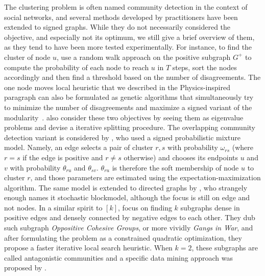 The clustering problem is often named community detection in the context of social networks, and
several methods developed by practitioners have been extended to signed graphs. While they do not
necessarily considered the \pcc{} objective, and especially not its optimum, we still give a brief
overview of them, as they tend to have been more tested experimentally. For instance, to find the
cluster of node $u$, \textcite{Yang2007} use a random walk approach on the positive subgraph $G^+$
to compute the probability of each node to reach $u$ in $T$ steps, sort the nodes accordingly and
then find a threshold  based on the number of disagreements.
The one node moves local heuristic that we described in the Physics-inspired paragraph
 can also be formulated as genetic algorithms that simultaneously try to
minimize the number of disagreements and maximize a signed variant of the
modularity~\autocites{Li2013}{Amelio2013}. \Textcite{Anchuri2012} also consider these two objectives
by seeing them as eigenvalue problems and devise a iterative splitting procedure.
The overlapping community detection variant is considered by \textcite{Chen14}, who used a signed
probabilistic mixture model. Namely, an edge selects a pair of cluster $r,s$ with probability
$\omega_{rs}$ (where $r=s$ if the edge is positive and $r\neq s$ otherwise) and chooses its endpoints
$u$ and $v$ with probability $\theta_{ru}$ and $\theta_{sv}$. $\theta_{ru}$ is therefore the soft
membership of node $u$ to cluster $r$, and those parameters are estimated using the
expectation-maximization algorithm. The same model is extended to directed graphs by
\textcite{Jiang2015}, who strangely enough names it stochastic blockmodel, although the focus is
still on edge and not nodes.
In a similar spirit to \maxa{}$[k]$, \textcite{SignedGang} focus on finding $k$ subgraphs dense in
positive edges and densely connected by negative edges to each other. They dub such subgraph
\emph{Oppositive Cohesive Groups}, or more vividly \emph{Gangs in War}, and after formulating the
problem as a constrained quadratic optimization, they propose a faster iterative local search
heuristic. When $k=2$, these subgraphs are called antagonistic communities and a specific data
mining approach was proposed by \textcite{quasiGang16}.
